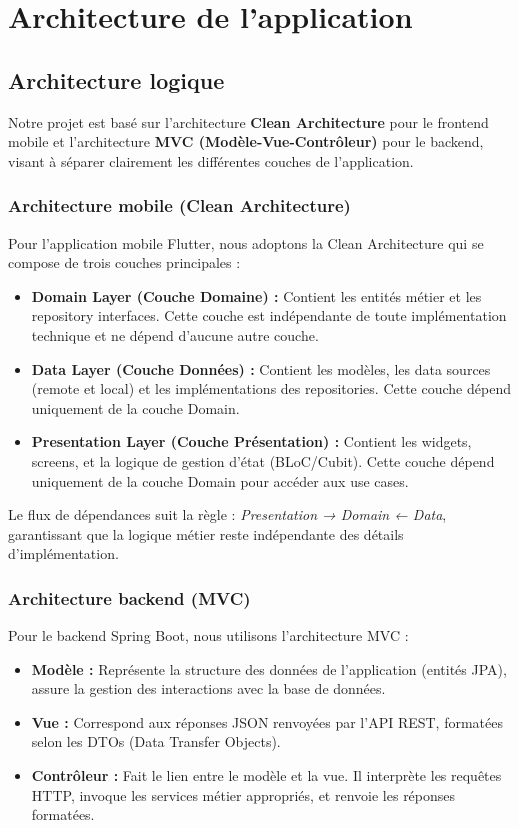 \section{Architecture de l'application}

\subsection{Architecture logique}
Notre projet est basé sur l'architecture \textbf{Clean Architecture} pour le frontend mobile et l'architecture \textbf{MVC (Modèle-Vue-Contrôleur)} pour le backend, visant à séparer clairement les différentes couches de l'application.

\subsubsection{Architecture mobile (Clean Architecture)}
Pour l'application mobile Flutter, nous adoptons la Clean Architecture qui se compose de trois couches principales :

\begin{itemize}
    \item \textbf{Domain Layer (Couche Domaine) :} Contient les entités métier et les repository interfaces. Cette couche est indépendante de toute implémentation technique et ne dépend d'aucune autre couche.

    \item \textbf{Data Layer (Couche Données) :} Contient les modèles, les data sources (remote et local) et les implémentations des repositories. Cette couche dépend uniquement de la couche Domain.

    \item \textbf{Presentation Layer (Couche Présentation) :} Contient les widgets, screens, et la logique de gestion d'état (BLoC/Cubit). Cette couche dépend uniquement de la couche Domain pour accéder aux use cases.
\end{itemize}

Le flux de dépendances suit la règle : \textit{Presentation → Domain ← Data}, garantissant que la logique métier reste indépendante des détails d'implémentation.

\subsubsection{Architecture backend (MVC)}
Pour le backend Spring Boot, nous utilisons l'architecture MVC :

\begin{itemize}
    \item \textbf{Modèle :} Représente la structure des données de l'application (entités JPA), assure la gestion des interactions avec la base de données.

    \item \textbf{Vue :} Correspond aux réponses JSON renvoyées par l'API REST, formatées selon les DTOs (Data Transfer Objects).

    \item \textbf{Contrôleur :} Fait le lien entre le modèle et la vue. Il interprète les requêtes HTTP, invoque les services métier appropriés, et renvoie les réponses formatées.
\end{itemize}

